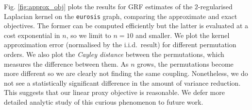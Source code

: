 Fig. \ref{fig:approx_obj} plots the results for GRF estimates of the $2$-regularised Laplacian kernel on the \lstinline{eurosis} graph, comparing the approximate and exact objectives.
The former can be computed efficiently but the latter is evaluated at a cost exponential in $n$, so we limit to $n=10$ and smaller.
We plot the kernel approximation error (normalised by the i.i.d.~result) for different permutation orders.
We also plot the \emph{Cayley distance} between the permutations, which measures the difference between them.
As $n$ grows, the permutations become more different so we are clearly not finding the same coupling.
Nonetheless, we do not see a statistically significant difference in the amount of variance reduction.
This suggests that our linear proxy objective is reasonable.
We defer more detailed analytic study of this curious phenomenon to future work.


